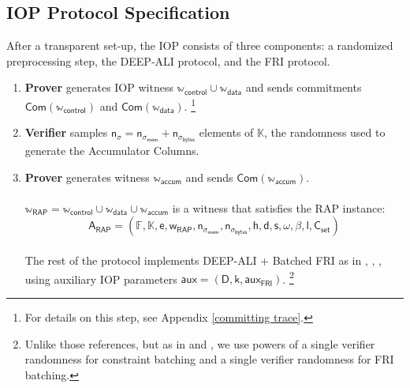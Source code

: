 \documentclass[10pt,letterpaper,titlepage]{article}
\theoremstyle{definition}
\begin{document}
\subsection{IOP Protocol Specification}
\label{IOP spec}
After a transparent set-up, the IOP consists of three components: a randomized preprocessing step, the DEEP-ALI protocol, and the FRI protocol.
\begin{enumerate}\addtocounter{enumi}{0}
\subsubsection{Randomized Preprocessing}
  \item \textbf{Prover} generates IOP witness $\mathbb{w}_\mathsf{control}\cup\mathbb{w}_\mathsf{data}$ and sends commitments $\mathsf{Com}(\mathbb{w}_\mathsf{control})$ and $\mathsf{Com}(\mathbb{w}_\mathsf{data})$.%
  \footnote{For details on this step, see Appendix \ref{committing trace}.}
  \item \textbf{Verifier} samples $\mathsf{n}_\sigma=\mathsf{n}_{\sigma_\mathsf{mem}}+\mathsf{n}_{\sigma_\mathsf{bytes}}$ elements of $\mathbb{K}$, the randomness used to generate the Accumulator Columns.
  \item \textbf{Prover} generates witness $\mathbb{w}_\mathsf{accum}$ and sends $\mathsf{Com}(\mathbb{w}_\mathsf{accum})$.\\
  \\
  $\mathbb{w}_\mathsf{RAP}=\mathbb{w}_\mathsf{control}\cup\mathbb{w}_\mathsf{data}\cup\mathbb{w}_\mathsf{accum}$ is a witness that satisfies the RAP instance:
  \[\mathsf{A}_\mathsf{RAP} =
  (\mathbb{F},
  \mathbb{K},
  \mathsf{e},
  \mathsf{w}_\mathsf{RAP},
  \mathsf{n}_{\sigma_\mathsf{mem}},
  \mathsf{n}_{\sigma_\mathsf{bytes}},
  \mathsf{h},
  \mathsf{d},
  \mathsf{s},
  \omega,
  \beta,
  \mathsf{l},
  \mathsf{C}_\mathsf{set})\]
  \\
  The rest of the protocol implements DEEP-ALI + Batched FRI as in \cite{ethSTARK}, \cite{deepFRI}, \cite{proxGaps},
  using auxiliary IOP parameters $\mathsf{aux} = (\mathsf{D},\mathsf{k},\mathsf{aux}_\mathsf{FRI})$.%
  \footnote{Unlike those references, but as in \cite{FRIsummary} and \cite{plonky2}, we use powers of a single verifier randomness for constraint batching and a single verifier randomness for FRI batching.}

\end{enumerate}
\end{document}
